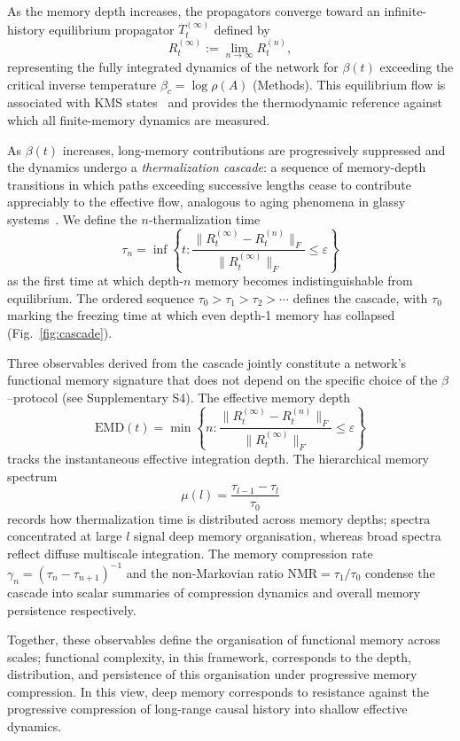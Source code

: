 \documentclass[aps,superscriptaddress,11pt]{revtex4-2}
\def\b{\beta}
\newcommand{\EMD}{\mathrm{EMD}}
\newcommand{\NMR}{\mathrm{NMR}}
\newcommand{\Rn}{R^{(n)}_t}
\newcommand{\Rinf}{R^{(\infty)}_t}
\newcommand{\Tinf}{T^{(\infty)}_t}
\theoremstyle{definition}
\theoremstyle{plain}
\begin{document}
As the memory depth increases, the propagators converge toward an
infinite-history equilibrium propagator $\Tinf$ defined by
\[
  \Rinf := \lim_{n\to\infty}\Rn,
\]
representing the fully integrated dynamics of the network for $\beta(t)$
exceeding the critical inverse temperature $\beta_c = \log\rho(A)$
(Methods). This equilibrium flow is associated with KMS
states~\cite{Moutuou2025a,Moutuou2025b} and provides the thermodynamic
reference against which all finite-memory dynamics are measured.

As $\beta(t)$ increases, long-memory contributions are progressively
suppressed and the dynamics undergo a \emph{thermalization cascade}: a
sequence of memory-depth transitions in which paths exceeding successive
lengths cease to contribute appreciably to the effective flow, 
analogous to aging phenomena in glassy
systems~\cite{Mezard1986,Vincent2007}. We define the $n$-thermalization time
\begin{equation}
  \tau_n = \inf\!\left\{
    t :
    \frac{\|\Rinf - \Rn\|_F}{\|\Rinf\|_F}
    \leq \varepsilon
  \right\}
  \label{eq:tau}
\end{equation}
as the first time at which depth-$n$ memory becomes indistinguishable from
equilibrium. The ordered sequence $\tau_0 > \tau_1 > \tau_2 > \cdots$
defines the cascade, with $\tau_0$ marking the freezing time at which even
depth-1 memory has collapsed (Fig.~\ref{fig:cascade}).

Three observables derived from the cascade jointly constitute a network's
functional memory signature that does not depend on the specific choice of 
the $\b$--protocol (see Supplementary S4). The effective memory depth
\[
  \EMD(t) = \min\!\left\{
    n :
    \frac{\|\Rinf-\Rn\|_F}{\|\Rinf\|_F} \leq \varepsilon
  \right\}
\]
tracks the instantaneous effective integration depth. The hierarchical memory spectrum
\begin{equation}
  \mu(l) = \frac{\tau_{l-1}-\tau_l}{\tau_0}
  \label{eq:hms}
\end{equation}
records how thermalization time is distributed across memory depths; spectra
concentrated at large $l$ signal deep memory organisation, whereas broad
spectra reflect diffuse multiscale integration. The memory compression rate
$\gamma_n = (\tau_n - \tau_{n+1})^{-1}$ and the non-Markovian ratio
$\NMR = \tau_1/\tau_0$ condense the cascade into scalar summaries of
compression dynamics and overall memory persistence respectively.

Together, these observables define the organisation of functional memory
across scales; functional complexity, in this framework, corresponds to the
depth, distribution, and persistence of this organisation under progressive
memory compression. In this view, deep memory corresponds to resistance against the progressive
compression of long-range causal history into shallow effective dynamics.
\end{document}

